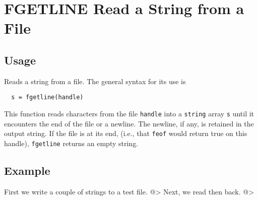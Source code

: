 \section{FGETLINE Read a String from a File}

\subsection{Usage}

Reads a string from a file.  The general syntax for its use
is
\begin{verbatim}
  s = fgetline(handle)
\end{verbatim}
This function reads characters from the file \verb|handle| into
a \verb|string| array \verb|s| until it encounters the end of the file
or a newline.  The newline, if any, is retained in the output
string.  If the file is at its end, (i.e., that \verb|feof| would
return true on this handle), \verb|fgetline| returns an empty
string.
\subsection{Example}

First we write a couple of strings to a test file.
@>
Next, we read then back.
@>
